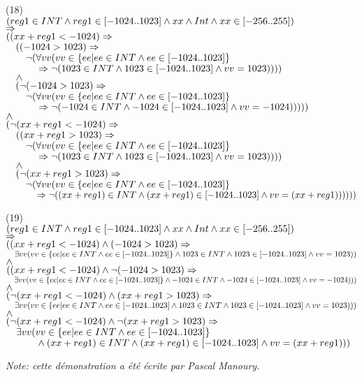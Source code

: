 \bigskip\noindent
(18)\\
$(reg1\in INT\et reg1\in[-1024..1023]\et xx\et Int\et xx\in[-256..255])$\\
$\fleche$\\
$(({xx+reg1} < -1024)\fleche$\\
$\tab{1em}((-1024 > 1023)\fleche$\\
$\tab{2em}\neg(\forall vv (vv\in \{ ee | ee\in INT \et ee\in [-1024..1023] \}$\\
$\tab{3em}\fleche\neg(1023\in INT\et 1023\in[-1024..1023]\et vv = 1023))))$\\
$\tab{1em}\et$\\
$\tab{1em}(\neg(-1024 > 1023)\fleche$\\
$\tab{2em}\neg(\forall vv (vv\in \{ ee | ee\in INT \et ee\in [-1024..1023] \}$\\
$\tab{3em}\fleche\neg(-1024\in INT\et -1024\in[-1024..1023]\et vv = -1024)))))$\\
$\et$\\
$(\neg({xx+reg1} < -1024)\fleche$\\
$\tab{1em}(({xx+reg1} > 1023)\fleche$\\
$\tab{2em}\neg(\forall vv (vv\in \{ ee | ee\in INT \et ee\in [-1024..1023] \}$\\
$\tab{3em}\fleche\neg(1023\in INT\et 1023\in[-1024..1023]\et vv = 1023))))$\\
$\tab{1em}\et$\\
$\tab{1em}(\neg( {xx+reg1} > 1023)\fleche$\\
$\tab{2em}\neg(\forall vv (vv\in \{ ee | ee\in INT \et ee\in [-1024..1023] \}$\\
$\tab{3em}\fleche\neg((xx+reg1)\in INT\et (xx+reg1)\in[-1024..1023]\et vv = (xx+reg1))))))$

\bigskip\noindent
(19)\\
$(reg1\in INT\et reg1\in[-1024..1023]\et xx\et Int\et xx\in[-256..255])$\\
$\fleche$\\
$(({xx+reg1} < -1024)\et (-1024 > 1023)\fleche$\\
$\tab{1em}\exists vv (vv\in \{ ee | ee\in INT \et ee\in [-1024..1023] \}
 \et 1023\in INT\et 1023\in[-1024..1023]\et vv = 1023))$\\
$\et$\\
$(({xx+reg1} < -1024)\et \neg(-1024 > 1023)\fleche$\\
$\tab{1em}\exists vv (vv\in \{ ee | ee\in INT \et ee\in [-1024..1023] \}
 \et -1024\in INT\et -1024\in[-1024..1023]\et vv = -1024)))$\\
$\et$\\
$(\neg({xx+reg1} < -1024)\et ({xx+reg1} > 1023)\fleche$\\
$\tab{1em}\exists vv (vv\in \{ ee | ee\in INT \et ee\in [-1024..1023] 
 \et 1023\in INT\et 1023\in[-1024..1023]\et vv = 1023)))$\\
$\et$\\
$(\neg({xx+reg1} < -1024)\et \neg( {xx+reg1} > 1023)\fleche$\\
$\tab{1em}\exists vv (vv\in \{ ee | ee\in INT \et ee\in [-1024..1023] \}$\\
$\tab{3em} \et (xx+reg1)\in INT\et (xx+reg1)\in[-1024..1023]\et vv = (xx+reg1)))$


\emph{Note: cette démonstration a été écrite par Pascal Manoury.}
